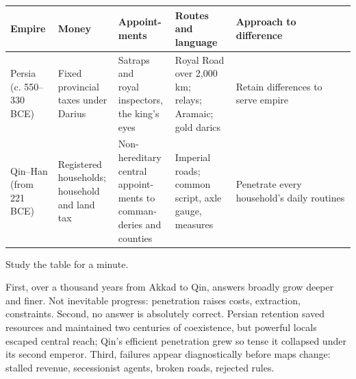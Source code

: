 \noindent
\begin{tabularx}{\linewidth}{llllX}
\toprule
Empire & Money & \shortstack[l]{Appoint-\\ments} & \shortstack[l]{Routes and\\language} & Approach to difference \\
\midrule
\shortstack[l]{Persia\\(c. 550--\\330 BCE)} & \shortstack[l]{Fixed\\provincial\\taxes under\\Darius} & \shortstack[l]{Satraps and\\royal\\inspectors,\\the king's\\eyes} & \shortstack[l]{Royal Road\\over 2,000 km;\\relays;\\Aramaic;\\gold darics} & Retain differences to serve empire \\
\shortstack[l]{Qin--Han\\(from 221\\BCE)} & \shortstack[l]{Registered\\households;\\household\\and land tax} & \shortstack[l]{Non-\\hereditary\\central\\appoint-\\ments to\\comman-\\deries and\\counties} & \shortstack[l]{Imperial\\roads;\\common\\script, axle\\gauge,\\measures} & Penetrate every household's daily routines \\
\bottomrule
\end{tabularx}

\smallskip
Study the table for a minute.

First, over a thousand years from Akkad to Qin, answers broadly grow deeper and finer. Not inevitable progress: penetration raises costs, extraction, constraints. Second, no answer is absolutely correct. Persian retention saved resources and maintained two centuries of coexistence, but powerful locals escaped central reach; Qin's efficient penetration grew so tense it collapsed under its second emperor. Third, failures appear diagnostically before maps change: stalled revenue, secessionist agents, broken roads, rejected rules.

